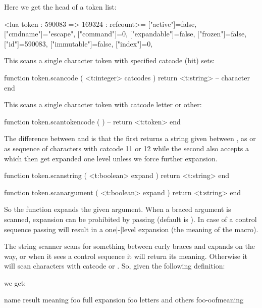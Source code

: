 Here we get the head of a token list:

\starttyping[option=LUA]
<lua token : 590083 => 169324 : refcount>={
 ["active"]=false,
 ["cmdname"]="escape",
 ["command"]=0,
 ["expandable"]=false,
 ["frozen"]=false,
 ["id"]=590083,
 ["immutable"]=false,
 ["index"]=0,
}
\stoptyping

This scans a single character token with specified catcode (bit) sets:

\starttyping[option=LUA]
function token.scancode ( <t:integer> catcodes )
    return <t:string> -- character
end
\stoptyping

This scans a single character token with catcode letter or other:

\starttyping[option=LUA]
function token.scantokencode ( )
    -- return <t:token>
end
\stoptyping

The difference between  and  is that the
first returns a string given between \type {{}}, as \type {\macro} or as sequence
of characters with catcode 11 or 12 while the second also accepts a \type {\cs}
which then get expanded one level unless we force further expansion.

\starttyping[option=LUA]
function token.scanstring ( <t:boolean> expand )
    return <t:string>
end

function token.scanargument ( <t:boolean> expand )
    return <t:string>
end
\stoptyping

So the  function expands the given argument. When a braced
argument is scanned, expansion can be prohibited by passing 
(default is ). In case of a control sequence passing 
will result in a one|-|level expansion (the meaning of the macro).

The string scanner scans for something between curly braces and expands on the
way, or when it sees a control sequence it will return its meaning. Otherwise it
will scan characters with catcode  or . So, given the
following definition:

\startbuffer
\def\oof{oof}
\def\foo{foo-\oof}
\stopbuffer

\typebuffer \getbuffer

we get:

\starttabulate[|l|Tl|l|]
\FL
\BC name \BC result \BC meaning \NC \NR
\TL
\NC {} \NC {} {foo} \NC full expansion     \NC \NR
\NC {}   \NC {} foo   \NC letters and others \NC \NR
\NC \type {\directlua{token.scanstring()}\foo}  \NC {}\foo   \NC meaning            \NC \NR
\LL
\stoptabulate

